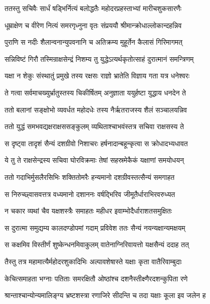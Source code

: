 
\twolineshloka
{ततस्तु सचिवैः सार्धं षड्भिर्नित्यं बलोद्धतैः}
{महोदरप्रहस्ताभ्यां मारीचशुकसारणैः} %

\twolineshloka
{धूम्राक्षेण च वीरेण नित्यं समरगृध्नुना}
{वृतः संप्रययौ श्रीमान्क्रोधाल्लोकान्दहन्निव} %

\twolineshloka
{पुराणि स नदीः शैलान्वनान्युपवनानि च}
{अतिक्रम्य मुहूर्तेन कैलासं गिरिमागमत्} %

\twolineshloka
{सन्निविष्टं गिरौ तस्मिन्राक्षसेन्द्रं निशम्य तु}
{युद्धेऽत्यर्थकृतोत्साहं दुरात्मानं समन्त्रिणम्} %

\twolineshloka
{यक्षा न शेकुः संस्थातुं प्रमुखे तस्य रक्षसः}
{राज्ञो भ्रातेति विज्ञाय गता यत्र धनेश्वरः} %

\twolineshloka
{ते गत्वा सर्वमाचख्युर्भ्रातुस्तस्य चिकीर्षितम्}
{अनुज्ञाता ययुर्हष्टा युद्धाय धनदेन ते} %

\twolineshloka
{ततो बलानां सङ्क्षोभो व्यवर्धत महोदधेः}
{तस्य नैर्ऋतराजस्य शैलं सञ्चालयन्निव} %

\twolineshloka
{ततो युद्धं समभवद्यक्षराक्षससङ्कुलम्}
{व्यथिताश्चाभवंस्तत्र सचिवा राक्षसस्य ते} %

\twolineshloka
{स दृष्ट्वा तादृशं सैन्यं दशग्रीवो निशाचरः}
{हर्षनादान्बहून्कृत्वा स क्रोधादभ्यधावत} %

\twolineshloka
{ये तु ते राक्षसेन्द्रस्य सचिवा घोरविक्रमाः}
{तेषां सहस्रमेकैकं यक्षाणां समयोधयन्} %

\twolineshloka
{ततो गदाभिर्मुसलैरसिभिः शक्तितोमरैः}
{हन्यमानो दशग्रीवस्तत्सैन्यं समगाहत} %

\twolineshloka
{स निरुच्छ्वासवत्तत्र वध्यमानो दशाननः}
{वर्षद्भिरिव जीमूतैर्धाराभिरवरुध्यत} %

\twolineshloka
{न चकार व्यथां चैव यक्षशस्त्रैः समाहतः}
{महीधर इवाम्भोदैर्धाराशतसमुक्षितः} %

\twolineshloka
{स दुरात्मा समुद्यम्य कालदण्डोपमां गदाम्}
{प्रविवेश ततः सैन्यं नयन्यक्षान्यमक्षयम्} %

\twolineshloka
{स कक्षमिव विस्तीर्णं शुष्केन्धनमिवाकुलम्}
{वातेनाग्निरिवायत्तो यक्षसैन्यं ददाह तत्} %

\twolineshloka
{तैस्तु तत्र महामात्यैर्महोदरशुकादिभिः}
{अल्पावशेषास्ते यक्षाः कृता वातैरिवाम्बुदाः} %

\twolineshloka
{केचित्समाहता भग्नाः पतिताः समरक्षितौ}
{ओष्ठांश्च दशनैस्तीक्ष्णैरदशन्कुपिता रणे} %

\twolineshloka
{श्रान्ताश्चान्योन्यमालिङ्ग्य भ्रष्टशस्त्रा रणाजिरे}
{सीदन्ति च तदा यक्षाः कूला इव जलेन ह} %

